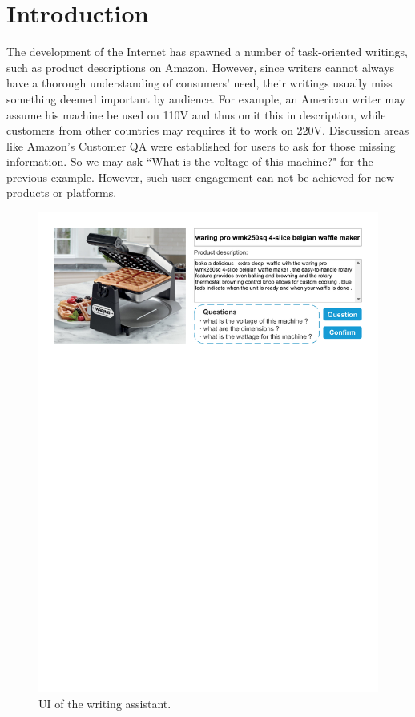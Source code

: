 \section{Introduction}
\label{sec:intro}

The development of the Internet has spawned a number of task-oriented writings, such as product descriptions on Amazon. However, since writers cannot always have a thorough understanding of consumers' need, their writings usually miss something deemed important by audience. For example, an American writer may assume his machine be used on 110V and thus omit this in description, while customers from other countries may requires it to work on 220V. Discussion areas like Amazon's Customer QA were established for users to ask for those missing information. So we may ask ``What is the voltage of this machine?" for the previous example. However, such user engagement can not be achieved for new products or platforms.

\begin{figure}[htbp]
\centering
\includegraphics[width=\linewidth]{WA_UI.pdf}
\caption{UI of the writing assistant.}
\label{fig:WA_UI}
\end{figure}

